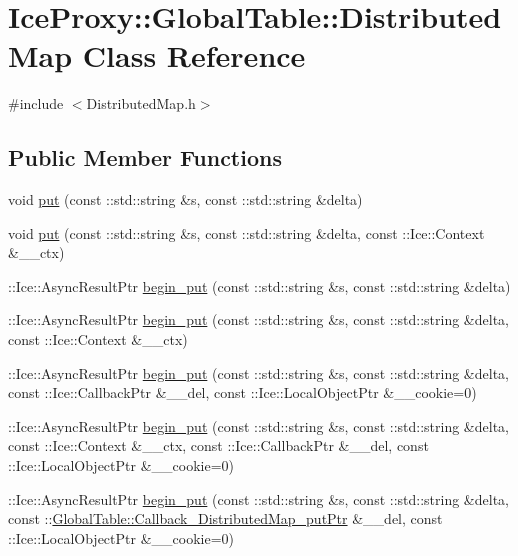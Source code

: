 \hypertarget{class_ice_proxy_1_1_global_table_1_1_distributed_map}{
\section{IceProxy::GlobalTable::DistributedMap Class Reference}
\label{class_ice_proxy_1_1_global_table_1_1_distributed_map}
}


{\ttfamily \#include $<$DistributedMap.h$>$}

\subsection*{Public Member Functions}
\begin{DoxyCompactItemize}
\item 
void \hyperlink{class_ice_proxy_1_1_global_table_1_1_distributed_map_aff768ea2e4278baf489e053a7c91d860}{put} (const ::std::string \&s, const ::std::string \&delta)
\item 
void \hyperlink{class_ice_proxy_1_1_global_table_1_1_distributed_map_a7510d666de09272847660a1709cf8b73}{put} (const ::std::string \&s, const ::std::string \&delta, const ::Ice::Context \&\_\-\_\-ctx)
\item 
::Ice::AsyncResultPtr \hyperlink{class_ice_proxy_1_1_global_table_1_1_distributed_map_a3373fde3c2f8126148f819ff7dc10af6}{begin\_\-put} (const ::std::string \&s, const ::std::string \&delta)
\item 
::Ice::AsyncResultPtr \hyperlink{class_ice_proxy_1_1_global_table_1_1_distributed_map_a69018bd44d0fdfa426211d5f89c36d34}{begin\_\-put} (const ::std::string \&s, const ::std::string \&delta, const ::Ice::Context \&\_\-\_\-ctx)
\item 
::Ice::AsyncResultPtr \hyperlink{class_ice_proxy_1_1_global_table_1_1_distributed_map_a06f7ce73d60c5a24ffa4bd3f317b510b}{begin\_\-put} (const ::std::string \&s, const ::std::string \&delta, const ::Ice::CallbackPtr \&\_\-\_\-del, const ::Ice::LocalObjectPtr \&\_\-\_\-cookie=0)
\item 
::Ice::AsyncResultPtr \hyperlink{class_ice_proxy_1_1_global_table_1_1_distributed_map_a1f47f535d113d8ffad751119a6b7fbab}{begin\_\-put} (const ::std::string \&s, const ::std::string \&delta, const ::Ice::Context \&\_\-\_\-ctx, const ::Ice::CallbackPtr \&\_\-\_\-del, const ::Ice::LocalObjectPtr \&\_\-\_\-cookie=0)
\item 
::Ice::AsyncResultPtr \hyperlink{class_ice_proxy_1_1_global_table_1_1_distributed_map_ad7e31b9865ae8a78857b251d9fa6bcdb}{begin\_\-put} (const ::std::string \&s, const ::std::string \&delta, const ::\hyperlink{namespace_global_table_a652e5fcf9acdfd0d854019d109b9644a}{GlobalTable::Callback\_\-DistributedMap\_\-putPtr} \&\_\-\_\-del, const ::Ice::LocalObjectPtr \&\_\-\_\-cookie=0)

\end{DoxyCompactItemize}
